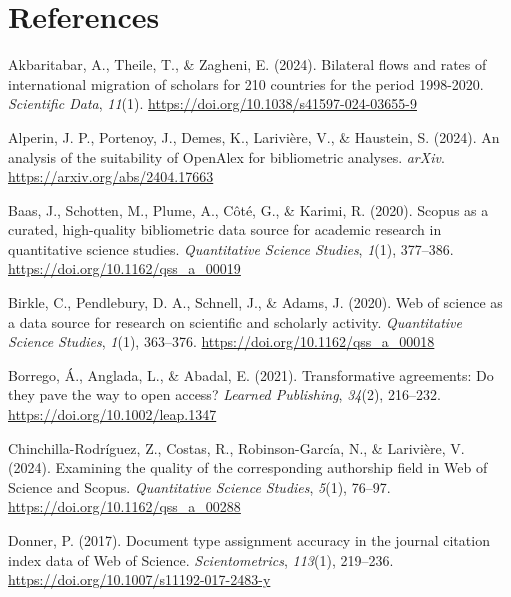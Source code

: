 \documentclass[a4paper,man,floatsintext,longtable,noextraspace,10pt]{apa6}
\newlength{\cslhangindent}
\newenvironment{CSLReferences}[2] %
{\begin{list}{}{%
  \setlength{\itemindent}{0pt}
  \setlength{\leftmargin}{0pt}
  \setlength{\parsep}{0pt}
  \ifodd #1
  \setlength{\leftmargin}{\cslhangindent}
  \setlength{\itemindent}{-1\cslhangindent}
  \fi
  \setlength{\itemsep}{#2\baselineskip}}}
{\end{list}}
\begin{document}
\section{References}\label{references}

\label{refs}
\begin{CSLReferences}{1}{0}
Akbaritabar, A., Theile, T., \& Zagheni, E. (2024). Bilateral flows and
rates of international migration of scholars for 210 countries for the
period 1998-2020. \emph{Scientific Data}, \emph{11}(1).
\url{https://doi.org/10.1038/s41597-024-03655-9}

Alperin, J. P., Portenoy, J., Demes, K., Larivière, V., \& Haustein, S.
(2024). An analysis of the suitability of OpenAlex for bibliometric
analyses. \emph{arXiv}. \url{https://arxiv.org/abs/2404.17663}

Baas, J., Schotten, M., Plume, A., Côté, G., \& Karimi, R. (2020).
Scopus as a curated, high-quality bibliometric data source for academic
research in quantitative science studies. \emph{Quantitative Science
Studies}, \emph{1}(1), 377--386.
\url{https://doi.org/10.1162/qss_a_00019}

Birkle, C., Pendlebury, D. A., Schnell, J., \& Adams, J. (2020). Web of
science as a data source for research on scientific and scholarly
activity. \emph{Quantitative Science Studies}, \emph{1}(1), 363--376.
\url{https://doi.org/10.1162/qss_a_00018}

Borrego, Á., Anglada, L., \& Abadal, E. (2021). Transformative
agreements: Do they pave the way to open access? \emph{Learned
Publishing}, \emph{34}(2), 216--232.
\url{https://doi.org/10.1002/leap.1347}

Chinchilla-Rodríguez, Z., Costas, R., Robinson-García, N., \& Larivière,
V. (2024). Examining the quality of the corresponding authorship field
in {Web of Science} and {Scopus}. \emph{Quantitative Science Studies},
\emph{5}(1), 76--97. \url{https://doi.org/10.1162/qss_a_00288}

Donner, P. (2017). Document type assignment accuracy in the journal
citation index data of {Web of Science}. \emph{Scientometrics},
\emph{113}(1), 219--236. \url{https://doi.org/10.1007/s11192-017-2483-y}


\end{CSLReferences}
\end{document}
